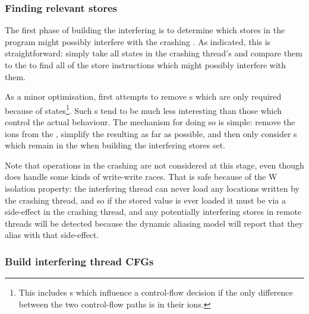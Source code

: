 \subsubsection{Finding relevant stores}

The first phase of building the interfering {\StateMachines} is to
determine which stores in the program might possibly interfere with
the crashing {\StateMachine}.  As indicated, this is straightforward:
simply take all  states in the crashing thread's
{\StateMachine} and compare them to the  to
find all of the store instructions which might possibly interfere with
them.

As a minor optimisation, {\implementation} first attempts to remove
s which are only required because of 
states\footnote{This includes s which influence a
  {\StateMachine} control-flow decision if the only difference between
  the two control-flow paths is in their ions.}.  Such
s tend to be much less interesting than those which
control the {\StateMachines} actual behaviour.  The mechanism for
doing so is simple: remove the ions from the
{\StateMachine}, simplify the resulting {\StateMachine} as far as
possible, and then only consider s which remain in the
{\StateMachine} when building the interfering stores set.

Note that  operations in the crashing {\StateMachine} are
not considered at this stage, even though {\technique} does handle
some kinds of write-write races.  That is safe because of the W
isolation property: the interfering thread can never load any
locations written by the crashing thread, and so if the stored value
is ever loaded it must be via a  side-effect in the
crashing thread, and any potentially interfering stores in remote
threads will be detected because the dynamic aliasing model will
report that they alias with that  side-effect.

\subsubsection{Build interfering thread CFGs}

